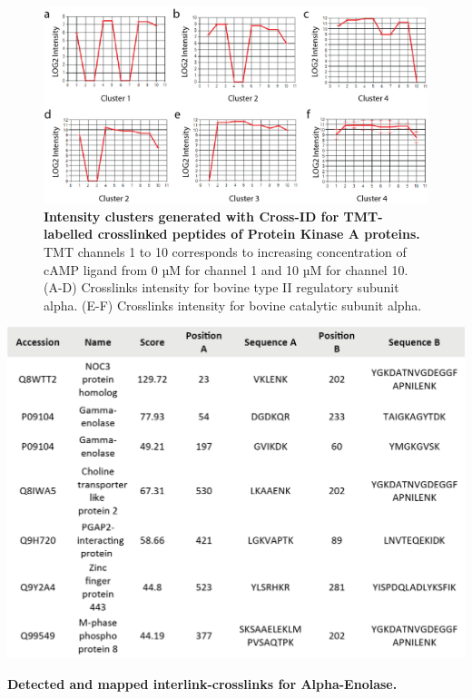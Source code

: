 \begin{subappendices}
  \begin{figure}[!hbt]
    \center
    \includegraphics[]{Chapter.2/Figures/fs1.png}
    \caption{
      \textbf{Intensity clusters generated with Cross-ID for TMT-labelled crosslinked peptides of Protein Kinase A proteins.} TMT channels 1 to 10 corresponds to increasing concentration of cAMP ligand from 0 µM for channel 1 and 10 µM for channel 10. (A-D) Crosslinks intensity for bovine type II regulatory subunit alpha. (E-F) Crosslinks intensity for bovine catalytic subunit alpha.
    }
    \label{fig:figs2.1}
  \end{figure}
  \vspace{1cm}
  \begin{table}[!hbt]
    \includegraphics[]{Chapter.2/Figures/ts1.png}
    \captionsetup{singlelinecheck = false, format= hang}
    \caption{
      \textbf{Detected and mapped interlink-crosslinks for Alpha-Enolase.}
    }
    \label{tab:tabs2.1}
  \end{table}
  \vspace{1cm}

\end{subappendices}
